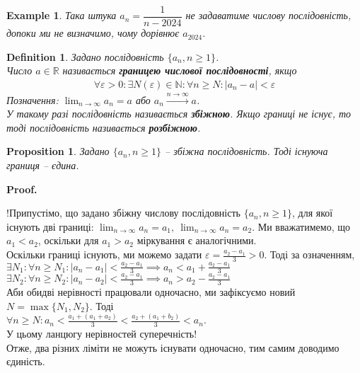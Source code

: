 \documentclass[a4paper, 14pt]{article}
\makeatletter
\def\qed{$\blacksquare$}
\theoremstyle{theoremdd}
\theoremstyle{theoremdd}
\newtheorem{definition}[theorem]{Definition}
\theoremstyle{theoremdd}
\theoremstyle{theoremdd}
\newtheorem{example}[theorem]{Example}
\theoremstyle{theoremdd}
\newtheorem{proposition}[theorem]{Proposition}
\theoremstyle{theoremdd}
\theoremstyle{theoremdd}
\theoremstyle{theoremdd}
\renewenvironment{proof}[1][Proof.\\]{\par
\pushQED{\hfill \qed}%
\normalfont \topsep6\p@\@plus6\p@\relax
\trivlist
\item\relax
{\bfseries
#1\@addpunct{.}}\hspace\labelsep\ignorespaces
}{%
\popQED\endtrivlist\@endpefalse
}
\makeatother
\begin{document}
	\begin{example}
	Така штука $a_n = \dfrac{1}{n - 2024}$ не задаватиме числову послідовність, допоки ми не визначимо, чому дорівнює $a_{2024}$.
	\end{example}
	
	\begin{definition} Задано послідовність $\{a_n, n \geq 1\}$.\\
	Число $a \in \mathbb{R}$ називається \textbf{границею числової послідовності}, якщо
	\begin{align*}
	\forall \varepsilon > 0: \exists N(\varepsilon) \in \mathbb{N}: \forall n \geq N: |a_n - a| < \varepsilon
	\end{align*}
	Позначення: $\displaystyle \lim_{n \to \infty} a_n = a$ або $a_n \xrightarrow{n \to \infty} a$.\\
	У такому разі послідовність називається \textbf{збіжною}. Якщо границі не існує, то тоді послідовність називається \textbf{розбіжною}.
	\end{definition}
	
	\begin{proposition}
	Задано $\{a_n, n \geq 1\}$ -- збіжна послідовність. Тоді існуюча границя -- єдина.
	\end{proposition}
	
	\begin{proof}
	!Припустімо, що задано збіжну числову послідовність $\{a_n, n \geq 1\}$, для якої існують дві границі: $\displaystyle \lim_{n \to \infty} a_n = a_1, \ \lim_{n \to \infty} a_n = a_2$. Ми вважатимемо, що $a_1 < a_2$, оскільки для $a_1 > a_2$ міркування є аналогічними.\\
	Оскільки границі існують, ми можемо задати $\displaystyle \varepsilon = \frac{a_2-a_1}{3} > 0$. Тоді за означенням,\\
	$\displaystyle \exists N_1: \forall n \geq N_1: |a_n-a_1|< \frac{a_2-a_1}{3} \implies a_n < a_1 + \frac{a_2-a_1}{3}$\\
	$\displaystyle \exists N_2: \forall n \geq N_2: |a_n-a_2|< \frac{a_2-a_1}{3} \implies a_n > a_2 - \frac{a_2-a_1}{3}$\\
	Аби обидві нерівності працювали одночасно, ми зафіксуємо новий $N= \max\{N_1,N_2\}$. Тоді\\
	$\displaystyle \forall n \geq N: a_n < \frac{a_1+(a_1+a_2)}{3} < \frac{a_2+(a_1+b_2)}{3}<a_n$. \\
	У цьому ланцюгу нерівностей суперечність! \\ 
	Отже, два різних ліміти не можуть існувати одночасно, тим самим доводимо єдиність.
	\end{proof}
	
\end{document}
